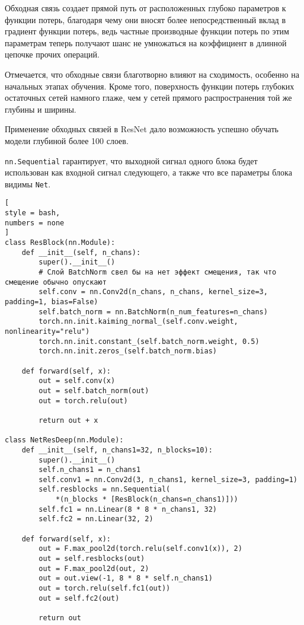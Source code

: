 \documentclass[%
	11pt,
	a4paper,
	utf8,
		]{article}
\begin{document}
Обходная связь создает прямой путь от расположенных глубоко параметров к функции потерь, благодаря чему они вносят более непосредственный вклад в градиент функции потерь, ведь частные производные функции потерь по этим параметрам теперь получают шанс не умножаться на коэффициент в длинной цепочке прочих операций.

Отмечается, что обходные связи благотворно влияют на сходимость, особенно на начальных этапах обучения. Кроме того, поверхность функции потерь глубоких остаточных сетей намного глаже, чем у сетей прямого распространения той же глубины и ширины.

Применение обходных связей в ResNet дало возможность успешно обучать модели глубиной более 100 слоев.

\verb|nn.Sequential| гарантирует, что выходной сигнал одного блока будет использован как входной сигнал следующего, а также что все параметры блока видимы \verb|Net|.

\begin{lstlisting}[
style = bash,
numbers = none
]
class ResBlock(nn.Module):
    def __init__(self, n_chans):
        super().__init__()
        # Слой BatchNorm свел бы на нет эффект смещения, так что смещение обычно опускают
        self.conv = nn.Conv2d(n_chans, n_chans, kernel_size=3, padding=1, bias=False)
        self.batch_norm = nn.BatchNorm(n_num_features=n_chans)
        torch.nn.init.kaiming_normal_(self.conv.weight, nonlinearity="relu")
        torch.nn.init.constant_(self.batch_norm.weight, 0.5)
        torch.nn.init.zeros_(self.batch_norm.bias)
        
    def forward(self, x):
        out = self.conv(x)
        out = self.batch_norm(out)
        out = torch.relu(out)
        
        return out + x

class NetResDeep(nn.Module):
    def __init__(self, n_chans1=32, n_blocks=10):
        super().__init__()
        self.n_chans1 = n_chans1
        self.conv1 = nn.Conv2d(3, n_chans1, kernel_size=3, padding=1)
        self.resblocks = nn.Sequential(
            *(n_blocks * [ResBlock(n_chans=n_chans1)]))
        self.fc1 = nn.Linear(8 * 8 * n_chans1, 32)
        self.fc2 = nn.Linear(32, 2)
        
    def forward(self, x):
        out = F.max_pool2d(torch.relu(self.conv1(x)), 2)
        out = self.resblocks(out)
        out = F.max_pool2d(out, 2)
        out = out.view(-1, 8 * 8 * self.n_chans1)
        out = torch.relu(self.fc1(out))
        out = self.fc2(out)
        
        return out
\end{lstlisting}
\end{document}
